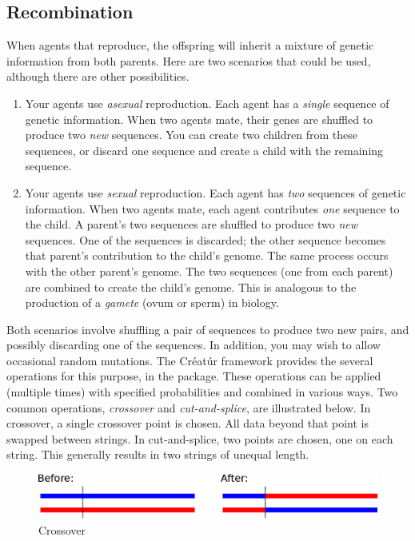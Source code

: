 \documentclass[a4paper,10pt]{report}
\begin{document}
\begin{itemize}
\chapter{Recombination}
\label{sec:recombination}

When agents that reproduce, the offspring will inherit a mixture of
genetic information from both parents.
Here are two scenarios that could be used, although there are other
possibilities.

\begin{enumerate}
\item Your agents use \emph{asexual} reproduction.
Each agent has a \emph{single} sequence of genetic information.
When two agents mate, their genes are shuffled to produce
two \emph{new} sequences.
You can create two children from these sequences,
or discard one sequence and create a child with the remaining sequence.
\item Your agents use \emph{sexual} reproduction.
Each agent has \emph{two} sequences of genetic information.
When two agents mate, each agent contributes \emph{one}
sequence to the child.
A parent's two sequences are shuffled to produce two \emph{new}
sequences.
One of the sequences is discarded; the other sequence becomes
that parent's contribution to the child's genome.
The same process occurs with the other parent's genome.
The two sequences (one from each parent) are combined to create the 
child's genome.
This is analogous to the production of a \emph{gamete} (ovum or sperm) 
in biology.
\end{enumerate}

Both scenarios involve shuffling a pair of sequences to produce two new
pairs, and possibly discarding one of the sequences.
In addition, you may wish to allow occasional random mutations.
The Créatúr framework provides the 
several operations for this purpose, in the
 package.
These operations can be applied (multiple times)
with specified probabilities
and combined in various ways.
Two common operations, \emph{crossover} and \emph{cut-and-splice},
are illustrated below.
In crossover, a single crossover point is chosen.
All data beyond that point is swapped between strings.
In cut-and-splice, two points are chosen, one on each string.
This generally results in two strings of unequal length.

\begin{figure}[hbtp]
 \centering
 \includegraphics[scale=0.7,keepaspectratio=true]{./images/crossover.eps}
  \caption{Crossover}
  \label{fig:crossover}
\end{figure}


\end{itemize}
\end{document}
